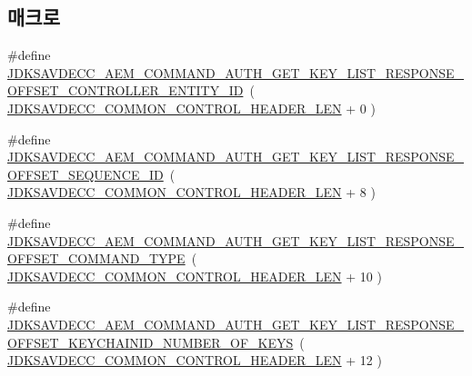 \subsection*{매크로}
\begin{DoxyCompactItemize}
\item 
\#define \hyperlink{group__command__auth__get__key__list__response_ga802761a4674ba394fc7643e66b7543e1}{J\+D\+K\+S\+A\+V\+D\+E\+C\+C\+\_\+\+A\+E\+M\+\_\+\+C\+O\+M\+M\+A\+N\+D\+\_\+\+A\+U\+T\+H\+\_\+\+G\+E\+T\+\_\+\+K\+E\+Y\+\_\+\+L\+I\+S\+T\+\_\+\+R\+E\+S\+P\+O\+N\+S\+E\+\_\+\+O\+F\+F\+S\+E\+T\+\_\+\+C\+O\+N\+T\+R\+O\+L\+L\+E\+R\+\_\+\+E\+N\+T\+I\+T\+Y\+\_\+\+ID}~( \hyperlink{group__jdksavdecc__avtp__common__control__header_gaae84052886fb1bb42f3bc5f85b741dff}{J\+D\+K\+S\+A\+V\+D\+E\+C\+C\+\_\+\+C\+O\+M\+M\+O\+N\+\_\+\+C\+O\+N\+T\+R\+O\+L\+\_\+\+H\+E\+A\+D\+E\+R\+\_\+\+L\+EN} + 0 )
\item 
\#define \hyperlink{group__command__auth__get__key__list__response_ga39a385e495a838aca808527838f939b3}{J\+D\+K\+S\+A\+V\+D\+E\+C\+C\+\_\+\+A\+E\+M\+\_\+\+C\+O\+M\+M\+A\+N\+D\+\_\+\+A\+U\+T\+H\+\_\+\+G\+E\+T\+\_\+\+K\+E\+Y\+\_\+\+L\+I\+S\+T\+\_\+\+R\+E\+S\+P\+O\+N\+S\+E\+\_\+\+O\+F\+F\+S\+E\+T\+\_\+\+S\+E\+Q\+U\+E\+N\+C\+E\+\_\+\+ID}~( \hyperlink{group__jdksavdecc__avtp__common__control__header_gaae84052886fb1bb42f3bc5f85b741dff}{J\+D\+K\+S\+A\+V\+D\+E\+C\+C\+\_\+\+C\+O\+M\+M\+O\+N\+\_\+\+C\+O\+N\+T\+R\+O\+L\+\_\+\+H\+E\+A\+D\+E\+R\+\_\+\+L\+EN} + 8 )
\item 
\#define \hyperlink{group__command__auth__get__key__list__response_ga98f33701a3616173c4f6a3e58de701cf}{J\+D\+K\+S\+A\+V\+D\+E\+C\+C\+\_\+\+A\+E\+M\+\_\+\+C\+O\+M\+M\+A\+N\+D\+\_\+\+A\+U\+T\+H\+\_\+\+G\+E\+T\+\_\+\+K\+E\+Y\+\_\+\+L\+I\+S\+T\+\_\+\+R\+E\+S\+P\+O\+N\+S\+E\+\_\+\+O\+F\+F\+S\+E\+T\+\_\+\+C\+O\+M\+M\+A\+N\+D\+\_\+\+T\+Y\+PE}~( \hyperlink{group__jdksavdecc__avtp__common__control__header_gaae84052886fb1bb42f3bc5f85b741dff}{J\+D\+K\+S\+A\+V\+D\+E\+C\+C\+\_\+\+C\+O\+M\+M\+O\+N\+\_\+\+C\+O\+N\+T\+R\+O\+L\+\_\+\+H\+E\+A\+D\+E\+R\+\_\+\+L\+EN} + 10 )
\item 
\#define \hyperlink{group__command__auth__get__key__list__response_gaf5f3cf80a543f78501b936e03abcec0f}{J\+D\+K\+S\+A\+V\+D\+E\+C\+C\+\_\+\+A\+E\+M\+\_\+\+C\+O\+M\+M\+A\+N\+D\+\_\+\+A\+U\+T\+H\+\_\+\+G\+E\+T\+\_\+\+K\+E\+Y\+\_\+\+L\+I\+S\+T\+\_\+\+R\+E\+S\+P\+O\+N\+S\+E\+\_\+\+O\+F\+F\+S\+E\+T\+\_\+\+K\+E\+Y\+C\+H\+A\+I\+N\+I\+D\+\_\+\+N\+U\+M\+B\+E\+R\+\_\+\+O\+F\+\_\+\+K\+E\+YS}~( \hyperlink{group__jdksavdecc__avtp__common__control__header_gaae84052886fb1bb42f3bc5f85b741dff}{J\+D\+K\+S\+A\+V\+D\+E\+C\+C\+\_\+\+C\+O\+M\+M\+O\+N\+\_\+\+C\+O\+N\+T\+R\+O\+L\+\_\+\+H\+E\+A\+D\+E\+R\+\_\+\+L\+EN} + 12 )

\end{DoxyCompactItemize}
